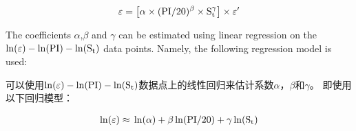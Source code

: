     
\begin{align}
    \varepsilon=\left[\alpha\times{}(\rm{PI}/20)^\beta\times{}S_t^\gamma\right]\times{}\varepsilon'
    \label{equation:8}
\end{align}

\begin{paracol}{2}

        The coefficients  $\alpha$,$\beta$ and $\gamma$ can be estimated using linear regression on the $\ln(\varepsilon)-\ln(\rm{PI})-\ln(S_t)$ data points. Namely, the following regression model is used:

    \switchcolumn

    可以使用$\ln(\varepsilon)-\ln(\rm{PI})-\ln(S_t)$数据点上的线性回归来估计系数$\alpha$，$\beta$和$\gamma$。 即使用以下回归模型：

\end{paracol}

\begin{align}
    \ln(\varepsilon)\approx{}\ln(\alpha)+\beta\ln(\rm{PI}/20)+\gamma\ln(S_t)
    \label{equation:9}
\end{align}

